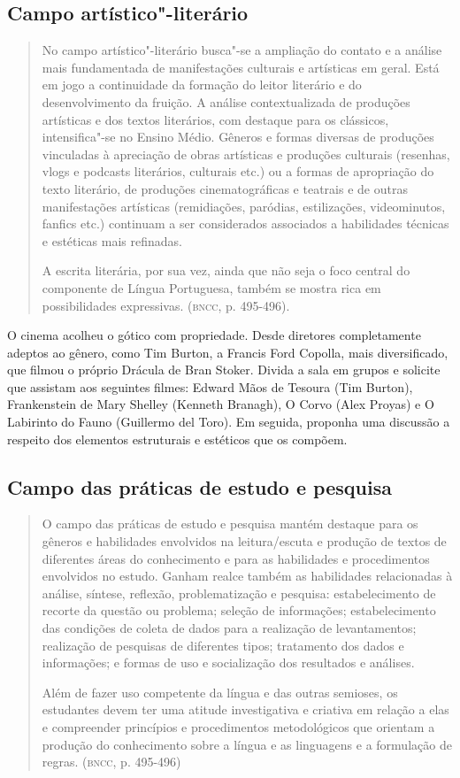 \documentclass[12pt]{extarticle}
\begin{document}
\subsection{Campo artístico"-literário}

\begin{quote}
No campo artístico"-literário busca"-se a ampliação do contato e a
análise mais fundamentada de manifestações culturais e artísticas em
geral. Está em jogo a continuidade da formação do leitor literário e do
desenvolvimento da fruição. A análise contextualizada de produções
artísticas e dos textos literários, com destaque para os clássicos,
intensifica"-se no Ensino Médio. Gêneros e formas diversas de produções
vinculadas à apreciação de obras artísticas e produções culturais
(resenhas, vlogs e podcasts literários, culturais etc.) ou a formas de
apropriação do texto literário, de produções cinematográficas e teatrais
e de outras manifestações artísticas (remidiações, paródias,
estilizações, videominutos, fanfics etc.) continuam a ser considerados
associados a habilidades técnicas e estéticas mais refinadas.

A escrita literária, por sua vez, ainda que não seja o foco central do
componente de Língua Portuguesa, também se mostra rica em possibilidades
expressivas. (\textsc{bncc}, p. 495-496).
\end{quote}

O cinema acolheu o gótico com propriedade. Desde diretores
completamente adeptos ao gênero, como Tim Burton, a Francis Ford
Copolla, mais diversificado, que filmou o próprio Drácula de Bran
Stoker. Divida a sala em grupos e solicite que assistam aos seguintes
filmes: Edward Mãos de Tesoura (Tim Burton), Frankenstein de Mary
Shelley (Kenneth Branagh), O Corvo (Alex Proyas) e O Labirinto do
Fauno (Guillermo del Toro). Em seguida, proponha uma discussão a
respeito dos elementos estruturais e estéticos que os compõem.

\subsection{Campo das práticas de estudo e pesquisa}

\begin{quote}
O campo das práticas de estudo e pesquisa mantém destaque para os
gêneros e habilidades envolvidos na leitura/escuta e produção de textos
de diferentes áreas do conhecimento e para as habilidades e
procedimentos envolvidos no estudo. Ganham realce também as habilidades
relacionadas à análise, síntese, reflexão, problematização e pesquisa:
estabelecimento de recorte da questão ou problema; seleção de
informações; estabelecimento das condições de coleta de dados para a
realização de levantamentos; realização de pesquisas de diferentes
tipos; tratamento dos dados e informações; e formas de uso e
socialização dos resultados e análises.

Além de fazer uso competente da língua e das outras semioses, os
estudantes devem ter uma atitude investigativa e criativa em relação a
elas e compreender princípios e procedimentos metodológicos que orientam
a produção do conhecimento sobre a língua e as linguagens e a formulação
de regras. (\textsc{bncc}, p. 495-496)
\end{quote}
\end{document}
